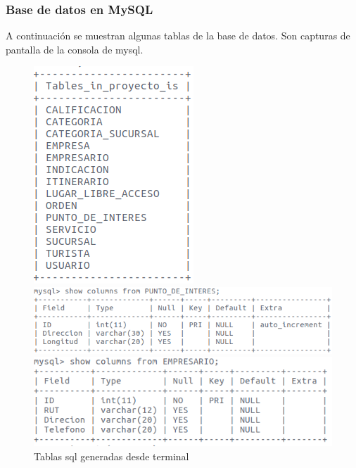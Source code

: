 \documentclass[12pt]{article}
\begin{document}
\subsubsection{Base de datos en MySQL}
A continuación se muestran algunas tablas de la base de datos. Son capturas de pantalla de la consola de mysql.\\
\begin{figure}[htp]
\centering
\begin{flushleft}\includegraphics[scale=0.50]{Informe/bd10.png}\end{flushleft}
\begin{flushleft}\includegraphics[scale=0.50]{Informe/bd11.png}\end{flushleft}
\begin{flushleft}\includegraphics[scale=0.50]{Informe/bd12.png}\end{flushleft}
\caption{Tablas sql generadas desde terminal}
\label{}
\end{figure}
\newpage
\end{document}

